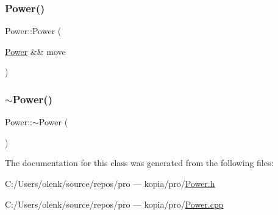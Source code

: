 \mbox{\label{class_power_ab5523c6d03675f2e88a3fda5befc1285}} 
\subsubsection{\texorpdfstring{Power()}{Power()}\hspace{0.1cm}{\footnotesize\ttfamily [2/2]}}
{\footnotesize\ttfamily Power\+::\+Power (\begin{DoxyParamCaption}\item[{\mbox{\hyperlink{class_power}{Power}} \&\&}]{move }\end{DoxyParamCaption})}

\mbox{\label{class_power_a02fbe8faaab8776a6a43e979ad2c9a44}} 
\subsubsection{\texorpdfstring{$\sim$Power()}{~Power()}}
{\footnotesize\ttfamily Power\+::$\sim$\+Power (\begin{DoxyParamCaption}{ }\end{DoxyParamCaption})}



The documentation for this class was generated from the following files\+:\begin{DoxyCompactItemize}
\item 
C\+:/\+Users/olenk/source/repos/pro — kopia/pro/\mbox{\hyperlink{_power_8h}{Power.\+h}}\item 
C\+:/\+Users/olenk/source/repos/pro — kopia/pro/\mbox{\hyperlink{_power_8cpp}{Power.\+cpp}}\end{DoxyCompactItemize}
